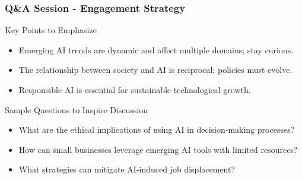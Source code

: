 \documentclass[aspectratio=169]{beamer}
\begin{document}
\begin{frame}[fragile]
    \frametitle{Q\&A Session - Engagement Strategy}
    \begin{block}{Key Points to Emphasize}
        \begin{itemize}
            \item Emerging AI trends are dynamic and affect multiple domains; stay curious.
            \item The relationship between society and AI is reciprocal; policies must evolve.
            \item Responsible AI is essential for sustainable technological growth.
        \end{itemize}
    \end{block}

    \begin{block}{Sample Questions to Inspire Discussion}
        \begin{itemize}
            \item What are the ethical implications of using AI in decision-making processes?
            \item How can small businesses leverage emerging AI tools with limited resources?
            \item What strategies can mitigate AI-induced job displacement?
        \end{itemize}
    \end{block}
\end{frame}
\end{document}
